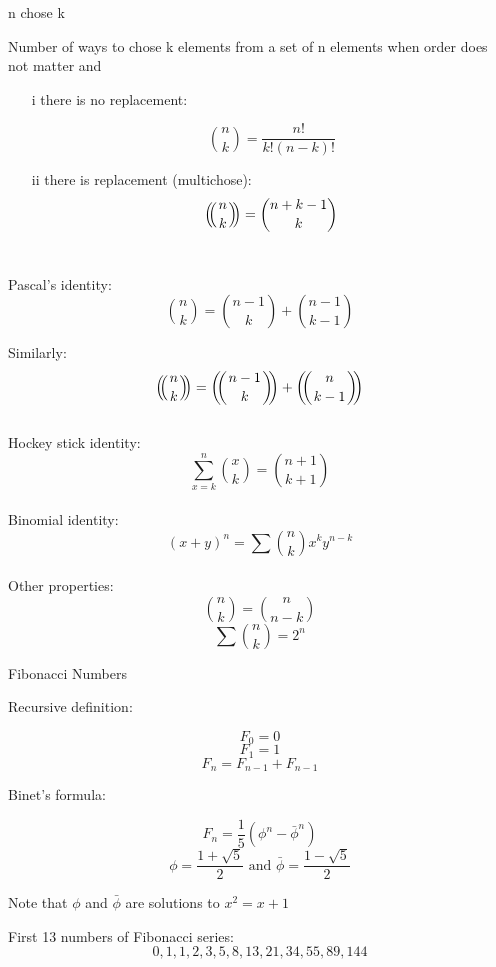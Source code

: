 \documentclass[12pt]{article}
\def\multiset#1#2{\ensuremath{\left(\kern-.3em\left(\genfrac{}{}{0pt}{}{#1}{#2}\right)\kern-.3em\right)}}
\begin{document}
\begin{center} n chose k \end{center}

\noindent Number of ways to chose k elements from a set of n elements when order does not matter and\\

\begin{itemize}
\item[i] there is no replacement:

\[ \binom{n}{k} = \frac{n!}{k!(n-k)!} \]

\item[ii] there is replacement (multichose):
\[\multiset{n}{k} = \binom{n+k-1}{k}\]\\
\end{itemize}

\noindent Pascal's identity:
\[\binom{n}{k} = \binom{n-1}{k}  + \binom{n-1}{k-1} \]

\noindent Similarly:
\[\multiset{n}{k} = \multiset{n-1}{k} + \multiset{n}{k-1}\]\\

\noindent Hockey stick identity:
\[\sum_{x=k}^n{\binom{x}{k}} = \binom{n+1}{k+1}\]\\

\noindent Binomial identity:
\[(x+y)^n = \sum{\binom{n}{k} x^k y^{n-k}} \]\\

\noindent Other properties:
\[\binom{n}{k} = \binom{n}{n-k} \]
\[\sum{\binom{n}{k}} = 2^n\]

\pagebreak

\begin{center} Fibonacci Numbers \end{center}

\noindent Recursive definition:

\[F_0 = 0\]
\[F_1 = 1\]
\[F_n = F_{n-1} + F_{n-1} \]

\noindent Binet's formula:

\[F_n = \frac 15 (\phi^n - \bar{\phi}^n)\]
\[\phi = \frac{1+\sqrt{5}}2 \text{ and } \bar{\phi} = \frac{1-\sqrt{5}}2\]

\begin{center}  Note that $\phi$ and $\bar{\phi}$ are solutions to $x^2 = x + 1$ \end{center}

\noindent First 13 numbers of Fibonacci series:
\[0, 1, 1, 2, 3, 5, 8, 13, 21, 34, 55, 89, 144\]\\
\end{document}
